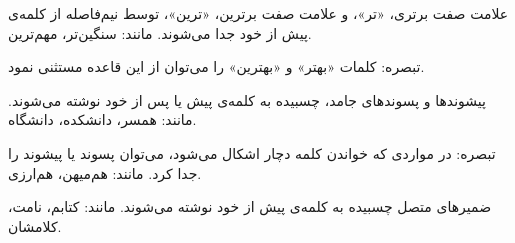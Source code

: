 %

علامت صفت برتری، «تر»، و علامت صفت برترین، «ترین»، توسط نیم‌فاصله از کلمه‌ی پیش از خود جدا می‌شوند. 
مانند: سنگین‌تر، مهم‌ترین.

        تبصره‌: کلمات «بهتر» و «بهترین» را می‌توان از این قاعده مستثنی نمود. 

پیشوندها و پسوندهای جامد، چسبیده به کلمه‌ی پیش یا پس از خود نوشته می‌شوند. مانند: همسر، دانشکده، دانشگاه.

        تبصره‌: در مواردی که خواندن کلمه دچار اشکال می‌شود، می‌توان پسوند یا پیشوند را جدا کرد. مانند: هم‌میهن، هم‌ارزی. 

ضمیرهای متصل چسبیده به کلمه‌ی پیش‌ از خود نوشته می‌شوند. مانند: کتابم، نامت، کلامشان. 


